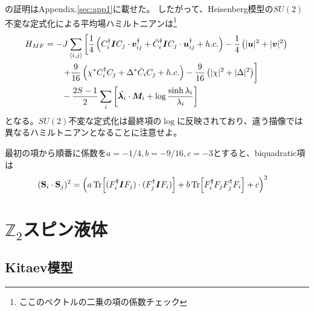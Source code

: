 \documentclass[11pt, aps, longbibliography]{article}
\begin{document}
        の証明はAppendix.\ref{sec:app1}に載せた。
        したがって、Heisenberg模型の$SU(2)$不変な定式化による平均場ハミルトニアンは\footnote{ここのベクトルの二乗の項の係数チェック}
        \begin{align}\label{eq:highS-MF-26}
            H_{MF} &= -J\sum_{\langle i,j \rangle} \left[ \frac{1}{4} \left( C_i^\dagger \boldsymbol{I}C_j \cdot \boldsymbol{v}_{ij}^\dagger + \bar{C}_i^\dagger \boldsymbol{I} C_j \cdot \boldsymbol{u}_{ij}^\dagger + h.c. \right) - \frac{1}{4} \left( |\boldsymbol{u}|^2 + |\boldsymbol{v}|^2 \right) \right.  \notag \\ 
            &\quad \quad \left. + \frac{9}{16}\left( \chi^*C_i^\dagger C_j + \Delta^* \bar{C}_iC_j + h.c.\right) - \frac{9}{16} \left( |\chi|^2 + |\Delta|^2 \right) \right] \notag \\
            &\quad \quad  - \frac{2S-1}{2}\sum_i \left[ \tilde{\boldsymbol{\lambda}_i} \cdot \boldsymbol{M}_i + \log \frac{\sinh \lambda_i}{\lambda_i}  \right]
        \end{align}
        となる。$SU(2)$不変な定式化は最終項の$\log$に反映されており、違う描像では異なるハミルトニアンとなることに注意せよ。



    最初の項から順番に係数を$a=-1/4,b=-9/16,c=-3$とすると、biquadratic項は
    \begin{align}
        (\mathbf{S}_i \cdot \mathbf{S}_j)^2 &= \left( a\Tr[(F_i^\dagger \boldsymbol{I} F_j) \cdot (F_j^\dagger \boldsymbol{I} F_i)] + b\Tr[F_i^\dagger F_j F_j^\dagger F_i] + c\right)^2 
    \end{align}

\newpage 

\section{$\mathbb{Z}_2$スピン液体}
    \subsection{Kitaev模型}
\end{document}

